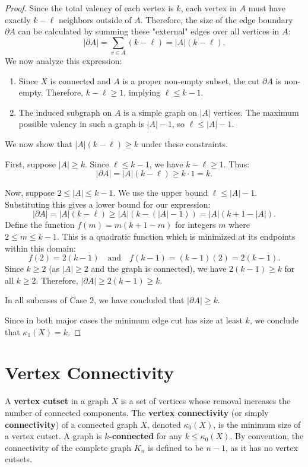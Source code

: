 \documentclass[12pt,a4paper,openany]{book}
\begin{document}
\begin{proof}
Since the total valency of each vertex is $k$, each vertex in $A$ must have exactly $k - \ell$ neighbors outside of $A$. Therefore, the size of the edge boundary $\partial A$ can be calculated by summing these "external" edges over all vertices in $A$:
\[
|\partial A| = \sum_{v \in A} (k - \ell) = |A|(k - \ell).
\]
We now analyze this expression:
\begin{enumerate}
    \item Since $X$ is connected and $A$ is a proper non-empty subset, the cut $\partial A$ is non-empty. Therefore, $k - \ell \geq 1$, implying $\ell \leq k-1$.
    \item The induced subgraph on $A$ is a simple graph on $|A|$ vertices. The maximum possible valency in such a graph is $|A| - 1$, so $\ell \leq |A| - 1$.
\end{enumerate}
We now show that $|A|(k - \ell) \geq k$ under these constraints.

First, suppose $|A| \geq k$. Since $\ell \leq k-1$, we have $k - \ell \geq 1$. Thus:
\[
|\partial A| = |A|(k - \ell) \geq k \cdot 1 = k.
\]

Now, suppose $2 \leq |A| \leq k-1$. We use the upper bound $\ell \leq |A| - 1$. Substituting this gives a lower bound for our expression:
\[
|\partial A| = |A|(k - \ell) \geq |A|(k - (|A| - 1)) = |A|(k + 1 - |A|).
\]
Define the function $f(m) = m(k + 1 - m)$ for integers $m$ where $2 \leq m \leq k-1$. This is a quadratic function which is minimized at its endpoints within this domain:
\[
f(2) = 2(k - 1) \quad \text{and} \quad f(k-1) = (k-1)(2) = 2(k - 1).
\]
Since $k \geq 2$ (as $|A| \geq 2$ and the graph is connected), we have $2(k-1) \geq k$ for all $k \geq 2$. Therefore, $|\partial A| \geq 2(k-1) \geq k$.

In all subcases of Case 2, we have concluded that $|\partial A| \geq k$.

Since in both major cases the minimum edge cut has size at least $k$, we conclude that $\kappa_1(X) = k$.
\end{proof}

\section{Vertex Connectivity}

A \textbf{vertex cutset} in a graph $X$ is a set of vertices whose removal increases the number of connected components. The \textbf{vertex connectivity} (or simply \textbf{connectivity}) of a connected graph $X$, denoted $\kappa_0(X)$, is the minimum size of a vertex cutset. A graph is \textbf{$k$-connected} for any $k \leq \kappa_0(X)$. By convention, the connectivity of the complete graph $K_n$ is defined to be $n-1$, as it has no vertex cutsets.
\end{document}
